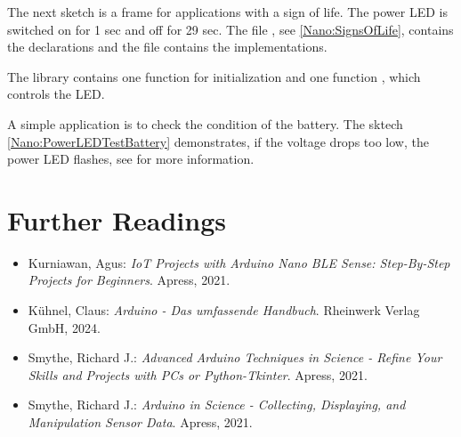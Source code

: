 \medskip

The next sketch is a frame for applications with a sign of life. The power LED is switched on for 1 sec and off for 29 sec. The file , see \ref{Nano:SignsOfLife}, contains the declarations and the file  contains the implementations. 


{
    \label{Nano:SignsOfLife}
    \label{Nano:SignsOfLifeHeader}
}


The library contains one function for initialization and one function , which controls the LED.


{
    \label{Nano:SignsOfLife}
    \label{Nano:SignsOfLifecpp}
}


\medskip


A simple application is to check the condition of the battery. The sktech \ref{Nano:PowerLEDTestBattery} demonstrates, if the voltage drops too low, the power LED flashes, see \cite{Scherer:2022} for more information.

{
    \label{Nano:PowerLEDTestBattery}
}


\section{Further Readings}

\begin{itemize}
  \item Kurniawan, Agus: \textsl{IoT Projects with Arduino Nano BLE Sense: Step-By-Step Projects for Beginners}. Apress, 2021. \cite{Kurniawan:2021b}
  \item K\"uhnel, Claus: \textsl{Arduino - Das umfassende Handbuch}. Rheinwerk Verlag GmbH, 2024. \cite{Kuehnel:2024}
  \item Smythe, Richard J.: \textsl{Advanced Arduino Techniques in Science - Refine Your Skills and Projects with PCs or Python-Tkinter}. Apress, 2021. \cite{Smythe:2021}
  \item Smythe, Richard J.: \textsl{Arduino in Science - Collecting, Displaying, and Manipulation Sensor Data}. Apress, 2021. \cite{Smythe:2021b}
\end{itemize}      


